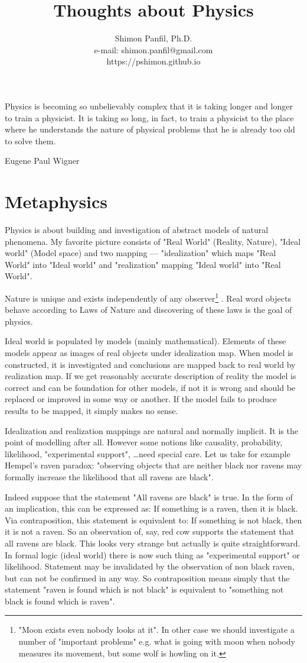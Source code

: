 \documentclass[11pt]{book}
\title{Thoughts about Physics}
\author{Shimon Panfil, Ph.D.\\
e-mail: shimon.panfil@gmail.com\\
https://pshimon.github.io}
\begin{document}
  

\maketitle
\epigraph{Physics is becoming so unbelievably complex that it is taking longer
and longer to train a physicist. It is taking so long, in fact, to train a 
physicist to the place where he understands the nature of physical problems that 
he is already too old to solve them.}{Eugene Paul Wigner}
\tableofcontents                        
\chapter{Metaphysics }
\label {metaphysics}
Physics is about building and investigation of abstract models  of natural phenomena.
My favorite picture consists of "Real World" (Reality, Nature), "Ideal world" (Model space)
and two mapping --- "idealization" which maps "Real World" into "Ideal world" and "realization"
mapping "Ideal world" into "Real World". 

Nature is unique and exists independently of any observer\footnote{"Moon exists even nobody looks at it".
In other case we should investigate a number of "important problems" e.g. what is going
with moon when nobody measures its movement, but some wolf is howling on it.}
. Real word objects behave 
according to Laws of Nature and discovering of these laws is the goal of physics.

Ideal world is populated by models (mainly mathematical). Elements of these models
appear as images of real objects under idealization map. When model is constructed, 
it is investigated and conclusions are mapped back to real world by realization map. 
If we get reasonably accurate description of reality the model is correct and can be foundation 
for other models, if not it is wrong and should be replaced or improved in some way or another.
If the model fails to produce results to be mapped, it simply makes no sense.

Idealization and realization mappings are natural and normally implicit. It is
the point of modelling after all. However some notions like causality, probability, likelihood,
"experimental support", \ldots need special care. Let us take for example  Hempel's raven paradox: "observing
objects that are neither black nor ravens may formally increase the likelihood 
that all ravens are black". 

Indeed suppose that the statement "All ravens are black" is true.
In the form of an 
implication, this can be expressed as: If something is a raven, then it 
is black. Via contraposition, this statement is equivalent to: If something is 
not black, then it is not a raven. So an observation of, say, red cow supports 
the statement that all ravens are black. This looks very strange but actually is quite
straightforward. In formal logic (ideal world) there is now such thing as "experimental support" or
likelihood. Statement may be invalidated by the observation of non black raven, but can not be confirmed in any way. So contraposition means simply that the statement "raven is found which is not black" is equivalent to "something not black is found which is raven". 
\end{document}
